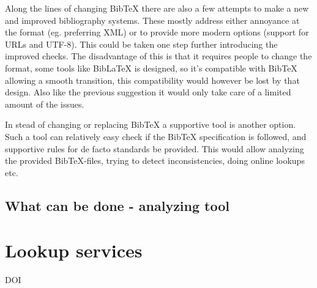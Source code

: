 Along the lines of changing Bib{\TeX} there are also a few attempts to
make a new and improved bibliography systems.  These mostly address
either annoyance at the format (eg. preferring XML) or to provide more
modern options (support for URLs and UTF-8).  This could be taken one
step further introducing the improved checks.  The disadvantage of
this is that it requires people to change the format, some tools like
Bib{\LaTeX} is designed, so it's compatible with Bib{\TeX} allowing a
smooth transition, this compatibility would however be lost by that
design.  Also like the previous suggestion it would only take care of
a limited amount of the issues.

In stead of changing or replacing Bib{\TeX} a supportive tool is
another option.  Such a tool can relatively easy check if the
Bib{\TeX} specification is followed, and supportive rules for de facto
standards be provided.  This would allow analyzing the provided
Bib{\TeX}-files, trying to detect inconsistencies, doing online
lookups etc.

\subsection{What can be done - analyzing tool }



\section{Lookup services}
DOI

